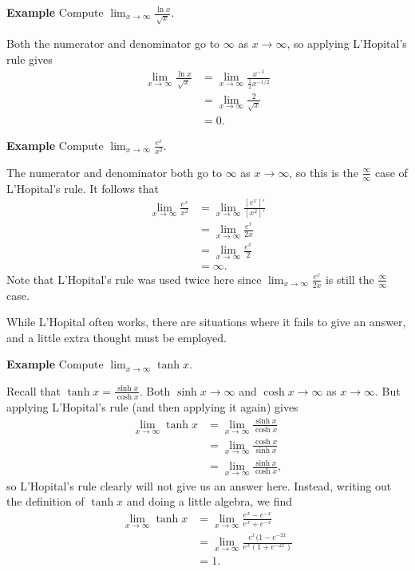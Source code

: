 \documentclass[a4paper]{book}
\begin{document}
\begin{sloppypar}
\textbf{Example} Compute $\displaystyle \lim_{x \rightarrow \infty} \frac{\ln x}{\sqrt{x}}$. 
\begin{examplebox}
Both the numerator and denominator go to $\infty$ as $x \rightarrow \infty$, so applying L'Hopital's rule gives
\begin{align*}
\lim_{x \rightarrow \infty} \frac{\ln x}{\sqrt{x}} &= \lim_{x \rightarrow \infty} \frac{x^{-1}}{\frac{1}{2}x^{-1/2}} \\
&= \lim_{x \rightarrow \infty} \frac{2}{\sqrt{x}} \\
&= 0.
\end{align*}
\end{examplebox}

\textbf{Example} Compute $\displaystyle \lim_{x \rightarrow \infty} \frac{e^{x}}{x^2}$.
\begin{examplebox}
The numerator and denominator both go to $\infty$ as $x \rightarrow \infty$, so this is the $\frac{\infty}{\infty}$ case of L'Hopital's rule. It follows that 
\begin{align*} 
\lim_{x\rightarrow \infty} \frac{e^x}{x^2} &= \lim_{x\rightarrow \infty} \frac{[e^x]'}{[x^2]'} \\
&= \lim_{x\rightarrow \infty} \frac{e^x}{2x} \\
&= \lim_{x \rightarrow \infty} \frac{e^x}{2} \\
&= \infty. 
\end{align*}
Note that L'Hopital's rule was used twice here since $\lim_{x\rightarrow \infty} \frac{e^x}{2x}$ is still the $\frac{\infty}{\infty}$ case.
\end{examplebox}

While L'Hopital often works, there are situations where it fails to give an answer, and a little extra thought must be employed.

\textbf{Example} Compute $\displaystyle \lim_{x \rightarrow \infty} \tanh x$. 
\begin{examplebox}
Recall that $\tanh x = \frac{\sinh x}{\cosh x}$. Both $\sinh x \rightarrow \infty$ and $\cosh x \rightarrow \infty$ as $x \rightarrow \infty$. But applying L'Hopital's rule (and then applying it again) gives
\begin{align*}
\lim_{x \rightarrow \infty} \tanh x &= \lim_{x \rightarrow \infty} \frac{\sinh x}{\cosh x} \\
&= \lim_{x \rightarrow \infty} \frac{\cosh x}{\sinh x} \\
&= \lim_{x \rightarrow \infty} \frac{\sinh x}{\cosh x}, 
\end{align*}
so L'Hopital's rule clearly will not give us an answer here. Instead, writing out the definition of $\tanh x$ and doing a little algebra, we find
\begin{align*}
\lim_{x \rightarrow \infty} \tanh x &= \lim_{x \rightarrow \infty} \frac{e^x - e^{-x}}{e^x + e^{-x}} \\
&= \lim_{x \rightarrow \infty} \frac{e^x(1 - e^{-2x}}{e^x(1 + e^{-2x})} \\
&= 1.
\end{align*}
\end{examplebox}


\end{sloppypar}
\end{document}
